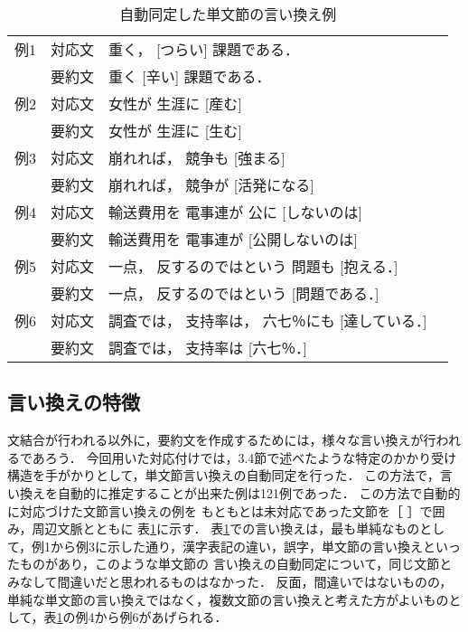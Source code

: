 \begin{table}
\caption{自動同定した単文節の言い換え例} 
\label{simplepara}
\begin{center}
\small
\begin{tabular}{|lll|p{}}
\hline
例1&対応文 & 重く， [つらい] 課題である．\\
   &要約文 & 重く [辛い] 課題である．\\ \hline
例2&対応文 & 女性が 生涯に [産む]\\
   &要約文 & 女性が 生涯に [生む]\\ \hline
例3&対応文 & 崩れれば， 競争も [強まる]\\
   &要約文 & 崩れれば， 競争が [活発になる]\\ \hline
例4&対応文 & 輸送費用を 電事連が 公に [しないのは] \\ 
   &要約文 & 輸送費用を 電事連が [公開しないのは] \\ \hline
例5&対応文 & 一点， 反するのではという 問題も [抱える．]\\
   &要約文 & 一点， 反するのではという [問題である．]\\ \hline
例6&対応文 & 調査では， 支持率は， 六七％にも [達している．]\\
   &要約文 & 調査では， 支持率は [六七％．]\\ \hline
\end{tabular}
\end{center}
\end{table}

\subsection{言い換えの特徴}

文結合が行われる以外に，要約文を作成するためには，様々な言い換えが行われるであろう．
今回用いた対応付けでは，3.4節で述べたような特定のかかり受け構造を手がかりとして，単文節言い換えの自動同定を行った．
この方法で，言い換えを自動的に推定することが出来た例は121例であった．
この方法で自動的に対応づけた文節言い換えの例を
もともとは未対応であった文節を［ ］で囲み，周辺文脈とともに
表\ref{simplepara}に示す．
表\ref{simplepara}での言い換えは，最も単純なものとして，例1から例3に示した通り，漢字表記の違い，誤字，単文節の言い換えといったものがあり，このような単文節の
言い換えの自動同定について，同じ文節とみなして間違いだと思われるものはなかった．
反面，間違いではないものの，単純な単文節の言い換えではなく，複数文節の言い換えと考えた方がよいものとして，表\ref{simplepara}の例4から例6があげられる．

